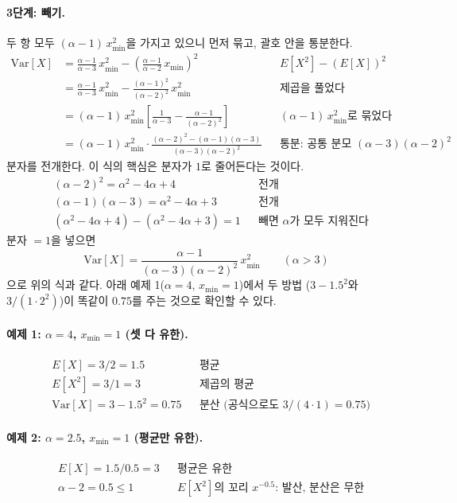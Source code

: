 \documentclass[11pt]{article}
\begin{document}
\paragraph{3단계: 빼기.} 두 항 모두 $(\alpha-1)\,x_{\min}^2$을 가지고 있으니 먼저 묶고,
괄호 안을 통분한다.
\begin{align*}
  \mathrm{Var}[X]
    &= \frac{\alpha-1}{\alpha-3}\,x_{\min}^2 - \left(\frac{\alpha-1}{\alpha-2}\,x_{\min}\right)^2
    && \text{$E[X^2] - (E[X])^2$}\\
    &= \frac{\alpha-1}{\alpha-3}\,x_{\min}^2 - \frac{(\alpha-1)^2}{(\alpha-2)^2}\,x_{\min}^2
    && \text{제곱을 풀었다}\\
    &= (\alpha-1)\,x_{\min}^2 \left[\frac{1}{\alpha-3} - \frac{\alpha-1}{(\alpha-2)^2}\right]
    && \text{$(\alpha-1)\,x_{\min}^2$로 묶었다}\\
    &= (\alpha-1)\,x_{\min}^2 \cdot \frac{(\alpha-2)^2 - (\alpha-1)(\alpha-3)}{(\alpha-3)(\alpha-2)^2}
    && \text{통분: 공통 분모 $(\alpha-3)(\alpha-2)^2$}
\end{align*}
분자를 전개한다. 이 식의 핵심은 분자가 $1$로 줄어든다는 것이다.
\begin{align*}
  &(\alpha-2)^2 = \alpha^2 - 4\alpha + 4 && \text{전개}\\
  &(\alpha-1)(\alpha-3) = \alpha^2 - 4\alpha + 3 && \text{전개}\\
  &(\alpha^2 - 4\alpha + 4) - (\alpha^2 - 4\alpha + 3) = 1 && \text{빼면 $\alpha$가 모두 지워진다}
\end{align*}
분자 $= 1$을 넣으면
\[
  \mathrm{Var}[X] = \frac{\alpha-1}{(\alpha-3)(\alpha-2)^2}\,x_{\min}^2
  \qquad (\alpha > 3)
\]
으로 위의 식과 같다. 아래 예제 1($\alpha = 4$, $x_{\min} = 1$)에서 두 방법
($3 - 1.5^2$와 $3/(1 \cdot 2^2)$)이 똑같이 $0.75$를 주는 것으로 확인할 수 있다.

\paragraph{예제 1: $\alpha = 4$, $x_{\min} = 1$ (셋 다 유한).}
\begin{align*}
  &E[X] = 3/2 = 1.5                && \text{평균}\\
  &E[X^2] = 3/1 = 3                && \text{제곱의 평균}\\
  &\mathrm{Var}[X] = 3 - 1.5^2 = 0.75 && \text{분산 (공식으로도 $3/(4 \cdot 1) = 0.75$)}
\end{align*}

\paragraph{예제 2: $\alpha = 2.5$, $x_{\min} = 1$ (평균만 유한).}
\begin{align*}
  &E[X] = 1.5/0.5 = 3   && \text{평균은 유한}\\
  &\alpha - 2 = 0.5 \le 1 && \text{$E[X^2]$의 꼬리 $x^{-0.5}$: 발산, 분산은 무한}
\end{align*}
\end{document}
